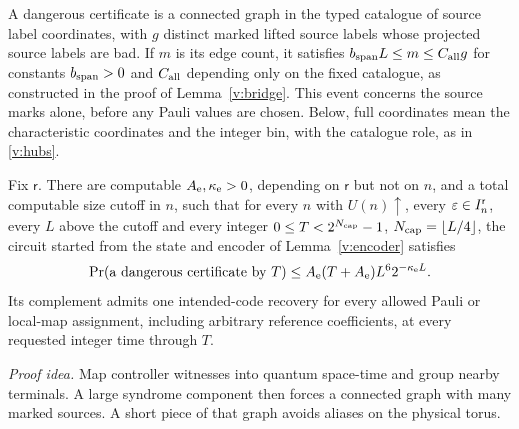 A dangerous certificate is a connected graph in the typed catalogue
of source label coordinates, with \(g\) distinct marked lifted source labels whose
projected source labels are bad. If \(m\) is its edge count, it satisfies
\(b_{\rm span}L\le m\le C_{\rm all}g\) for constants \(b_{\rm span}>0\) and \(C_{\rm all}\) depending only on the fixed catalogue, as constructed in the proof of Lemma~\ref{v:bridge}. This event concerns the source
marks alone, before any Pauli values are chosen. Below, full coordinates
mean the characteristic coordinates and the integer bin, with the
catalogue role, as in \eqref{v:hubs}.

\begin{lemma}\label{v:bridge}
Fix \(\mathsf r\). There are computable \(A_{\rm e},\kappa_{\rm e}>0\),
depending on \(\mathsf r\) but not on \(n\), and a total computable size
cutoff in \(n\), such that for every \(n\) with \(U(n)\uparrow\), every
\(\varepsilon\in I_n^{\mathsf r}\), every \(L\) above the cutoff and every
integer \(0\le T<2^{N_{\rm cap}}-1\), \(N_{\rm cap}=\lfloor L/4\rfloor\),
the circuit started from the state and encoder of
Lemma~\ref{v:encoder} satisfies
\begin{equation}\label{v:exp-bound}
 \Pr(\text{a dangerous certificate by }T)
 \le A_{\rm e}(T+A_{\rm e})L^6 2^{-\kappa_{\rm e}L}.
\end{equation}
Its complement admits one intended-code recovery for every allowed
Pauli or local-map assignment, including arbitrary reference
coefficients, at every requested integer time through \(T\).
\end{lemma}
\par\noindent\emph{Proof idea.} Map controller witnesses into quantum space-time and group nearby terminals. A large syndrome component then forces a connected graph with many marked sources. A short piece of that graph avoids aliases on the physical torus.

